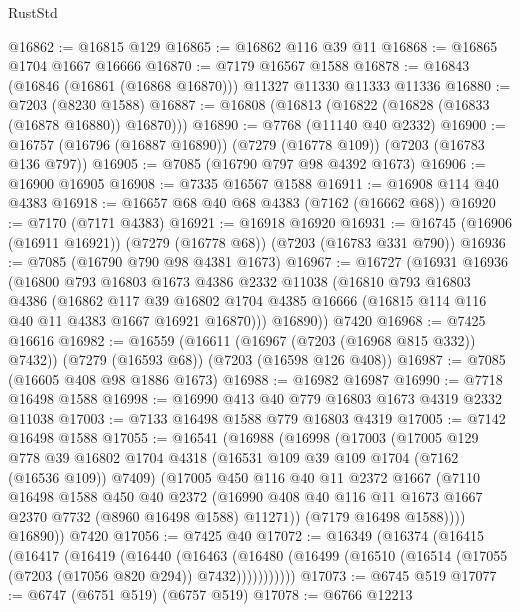 \begin{lexlean}{RustStd}
\begin{coremodule}
@16862 := @16815 @129
@16865 := @16862 @116 @39 @11
@16868 := @16865 @1704 @1667 @16666
@16870 := @7179 @16567 @1588
@16878 := @16843 (@16846 (@16861 (@16868 @16870))) @11327 @11330 @11333 @11336
@16880 := @7203 (@8230 @1588)
@16887 := @16808 (@16813 (@16822 (@16828 (@16833 (@16878 @16880)) @16870)))
@16890 := @7768 (@11140 @40 @2332)
@16900 := @16757 (@16796 (@16887 @16890)) (@7279 (@16778 @109)) (@7203 (@16783 @136 @797))
@16905 := @7085 (@16790 @797 @98 @4392 @1673)
@16906 := @16900 @16905
@16908 := @7335 @16567 @1588
@16911 := @16908 @114 @40 @4383
@16918 := @16657 @68 @40 @68 @4383 (@7162 (@16662 @68))
@16920 := @7170 (@7171 @4383)
@16921 := @16918 @16920
@16931 := @16745 (@16906 (@16911 @16921)) (@7279 (@16778 @68)) (@7203 (@16783 @331 @790))
@16936 := @7085 (@16790 @790 @98 @4381 @1673)
@16967 := @16727
    (@16931
      @16936
      (@16800
        @793
        @16803
        @1673
        @4386
        @2332
        @11038
        (@16810
          @793
          @16803
          @4386
          (@16862
            @117
            @39
            @16802
            @1704
            @4385
            @16666
            (@16815 @114 @116 @40 @11 @4383 @1667 @16921 @16870)))
        @16890))
    @7420
@16968 := @7425 @16616
@16982 := @16559
    (@16611 (@16967 (@7203 (@16968 @815 @332)) @7432))
    (@7279 (@16593 @68))
    (@7203 (@16598 @126 @408))
@16987 := @7085 (@16605 @408 @98 @1886 @1673)
@16988 := @16982 @16987
@16990 := @7718 @16498 @1588
@16998 := @16990 @413 @40 @779 @16803 @1673 @4319 @2332 @11038
@17003 := @7133 @16498 @1588 @779 @16803 @4319
@17005 := @7142 @16498 @1588
@17055 := @16541
    (@16988
      (@16998
        (@17003
          (@17005
            @129
            @778
            @39
            @16802
            @1704
            @4318
            (@16531 @109 @39 @109 @1704 (@7162 (@16536 @109)) @7409)
            (@17005
              @450
              @116
              @40
              @11
              @2372
              @1667
              (@7110
                @16498
                @1588
                @450
                @40
                @2372
                (@16990 @408 @40 @116 @11 @1673 @1667 @2370 @7732 (@8960 @16498 @1588) @11271))
              (@7179 @16498 @1588))))
        @16890))
    @7420
@17056 := @7425 @40
@17072 := @16349
    (@16374
      (@16415
        (@16417
          (@16419
            (@16440
              (@16463
                (@16480 (@16499 (@16510 (@16514 (@17055 (@7203 (@17056 @820 @294)) @7432)))))))))))
@17073 := @6745 @519
@17077 := @6747 (@6751 @519) (@6757 @519)
@17078 := @6766 @12213

\end{coremodule}
\end{lexlean}
